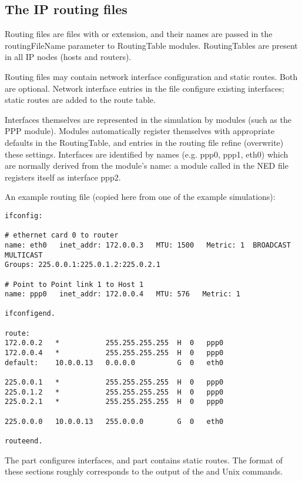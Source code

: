 \subsection{The IP routing files}

Routing files are files with  or  extension,
and their names are passed in the routingFileName parameter
to RoutingTable modules. RoutingTables are present in all
IP nodes (hosts and routers).

Routing files may contain network interface configuration and static
routes. Both are optional. Network interface entries in the file
configure existing interfaces; static routes are added to the route table.

Interfaces themselves are represented in the simulation by modules
(such as the PPP module). Modules automatically register themselves
with appropriate defaults in the RoutingTable, and entries in the
routing file refine (overwrite) these settings.
Interfaces are identified by names (e.g. ppp0, ppp1, eth0) which
are normally derived from the module's name: a module called
 in the NED file registers itself as interface ppp2.

An example routing file (copied here from one of the example simulations):

\begin{verbatim}
ifconfig:

# ethernet card 0 to router
name: eth0   inet_addr: 172.0.0.3   MTU: 1500   Metric: 1  BROADCAST MULTICAST
Groups: 225.0.0.1:225.0.1.2:225.0.2.1

# Point to Point link 1 to Host 1
name: ppp0   inet_addr: 172.0.0.4   MTU: 576   Metric: 1

ifconfigend.

route:
172.0.0.2   *           255.255.255.255  H  0   ppp0
172.0.0.4   *           255.255.255.255  H  0   ppp0
default:    10.0.0.13   0.0.0.0          G  0   eth0

225.0.0.1   *           255.255.255.255  H  0   ppp0
225.0.1.2   *           255.255.255.255  H  0   ppp0
225.0.2.1   *           255.255.255.255  H  0   ppp0

225.0.0.0   10.0.0.13   255.0.0.0        G  0   eth0

routeend.
\end{verbatim}

The  part configures interfaces,
and  part contains static routes.
The format of these sections roughly corresponds to the output
of the  and  Unix commands.

